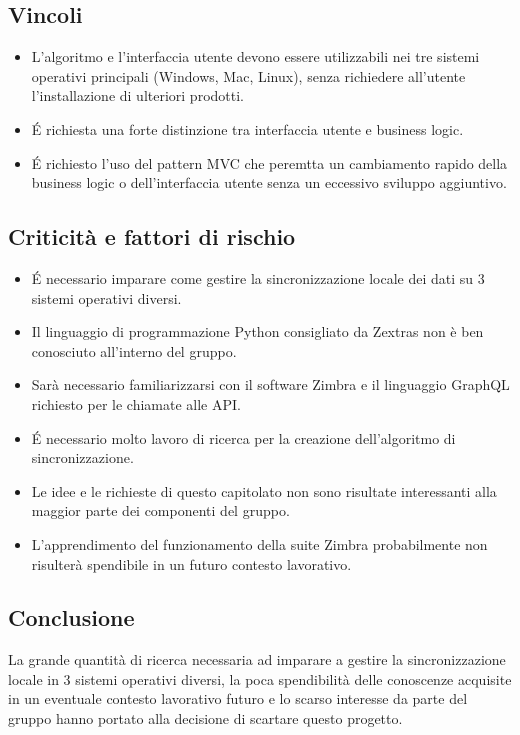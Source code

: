 \subsection{Vincoli}
\begin{itemize}
\item L'algoritmo e l'interfaccia utente devono essere utilizzabili nei tre sistemi operativi principali (Windows, Mac, Linux), senza richiedere all'utente l'installazione di ulteriori prodotti.
\item É richiesta una forte distinzione tra interfaccia utente e business logic.
\item É richiesto l'uso del pattern MVC che peremtta un cambiamento rapido della business logic o dell'interfaccia utente senza un eccessivo sviluppo aggiuntivo.
\end{itemize}

\subsection{Criticità e fattori di rischio}
\begin{itemize}
\item É necessario imparare come gestire la sincronizzazione locale dei dati su 3 sistemi operativi diversi.
\item Il linguaggio di programmazione Python consigliato da Zextras non è ben conosciuto all'interno del gruppo.
\item Sarà necessario familiarizzarsi con il software Zimbra e il linguaggio GraphQL richiesto per le chiamate alle API.
\item É necessario molto lavoro di ricerca per la creazione dell'algoritmo di sincronizzazione.
\item Le idee e le richieste di questo capitolato non sono risultate interessanti alla maggior parte dei componenti del gruppo.
\item L'apprendimento del funzionamento della suite Zimbra probabilmente non risulterà spendibile in un futuro contesto lavorativo.
\end{itemize}

\subsection{Conclusione}
La grande quantità di ricerca necessaria ad imparare a gestire la sincronizzazione locale in 3 sistemi operativi diversi, la poca spendibilità delle conoscenze acquisite in un eventuale contesto lavorativo futuro e lo scarso interesse da parte del gruppo hanno portato alla decisione di scartare questo progetto.
